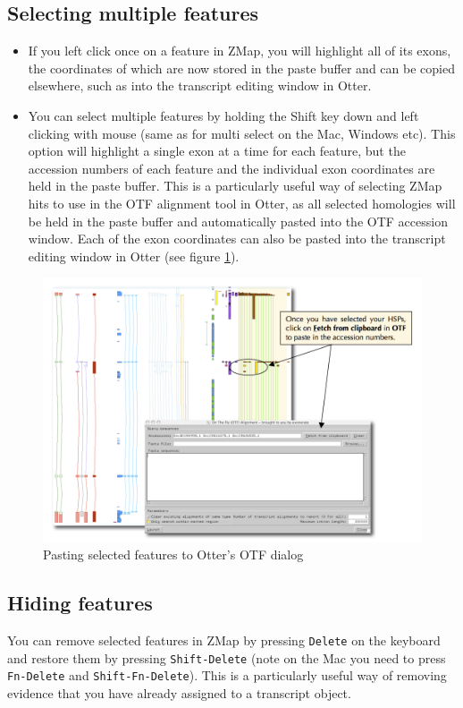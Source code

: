 \documentclass[letterpaper]{article}
\begin{document}
\subsection{Selecting multiple features}
\begin{itemize}
\item If you left click once on a feature in ZMap, you will highlight all of its exons, the coordinates of which are now stored in the paste buffer and can be copied elsewhere, such as into the transcript editing window in Otter.
\item You can select multiple features by holding the Shift key down and left clicking with mouse (same as for multi select on the Mac, Windows etc). This option will highlight a single exon at a time for each feature, but the accession numbers of each feature and the individual exon coordinates are held in the paste buffer. This is a particularly useful way of selecting ZMap hits to use in the OTF alignment tool in Otter, as all selected homologies will be held in the paste buffer and automatically pasted into the OTF accession window. Each of the exon coordinates can also be pasted into the transcript editing window in Otter (see figure \ref{img_paste_features}).
\end{itemize}

\begin{figure}
\centering
\color[rgb]{0.30980393,0.5058824,0.7411765}
\includegraphics[width=15.231cm]{images/show_hide.png}
\caption{Pasting selected features to Otter's OTF dialog}
\label{img_paste_features}
\end{figure}


\subsection{Hiding features}
You can remove selected features in ZMap by pressing \lstinline{Delete} on the keyboard and restore them by pressing \lstinline{Shift-Delete} (note on the Mac you need to press \lstinline{Fn-Delete} and \lstinline{Shift-Fn-Delete}). This is a particularly useful way of removing evidence that you have already assigned to a transcript object.
\end{document}
